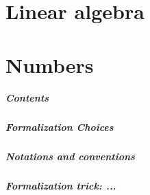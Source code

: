 \chapter{Linear algebra}
\label{linalg:smith}

\chapter{Numbers}

\paragraph{Contents}

\paragraph{Formalization Choices}

\paragraph{Notations and conventions}

\paragraph{Formalization trick: ...}


